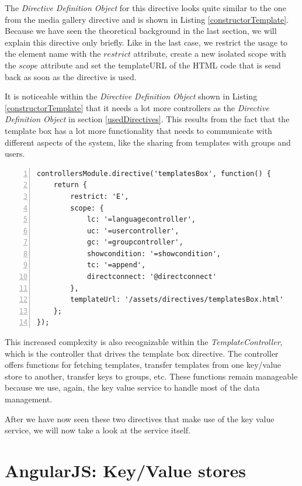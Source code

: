 The \emph{Directive Definition Object} for this directive looks quite similar to the one from the media gallery directive and is shown in Listing \ref{constructorTemplate}. Because we have seen the theoretical background in the last section, we will explain this directive only briefly. Like in the last case, we restrict the usage to the element name with the $restrict$ attribute, create a new isolated scope with the $scope$ attribute and set the templateURL of the \ac{HTML} code that is send back as soon as the directive is used. 

It is noticeable within the \emph{Directive Definition Object} shown in Listing \ref{constructorTemplate} that it needs a lot more controllers as the \emph{Directive Definition Object} in section \ref{usedDirectives}. This results from the fact that the template box has a lot more functionality that needs to communicate with different aspects of the system, like the sharing from templates with groups and users.

\begin{lstlisting}[numbers=left,caption={The listing shows the initialisation of the template box directive},label=constructorTemplate,frame=tlbr,breaklines]
controllersModule.directive('templatesBox', function() {
    return {
        restrict: 'E',
        scope: {
            lc: '=languagecontroller',
            uc: '=usercontroller',
            gc: '=groupcontroller',
            showcondition: '=showcondition',
            tc: '=append',
            directconnect: '@directconnect'
        },
        templateUrl: '/assets/directives/templatesBox.html'
    };
});
\end{lstlisting}

This increased complexity is also recognizable within the \emph{TemplateController}, which is the controller that drives the template box directive. The controller offers functions for fetching templates, transfer templates from one key/value store to another, transfer keys to groups, etc. These functions remain manageable because we use, again, the key value service to handle most of the data management. 

After we have now seen these two directives that make use of the key value service, we will now take a look at the service itself.

\section{AngularJS: Key/Value stores}
\label{keyValueService}

